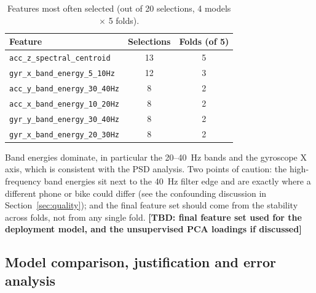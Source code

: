 \documentclass[10pt,a4paper]{article}
\newcommand{\tbd}[1]{\textbf{\textcolor{red!70!black}{[TBD: #1]}}}
\begin{document}
\begin{table}[!htbp]
\centering
\caption{Features most often selected (out of 20 selections, 4 models $\times$ 5 folds).}
\label{tab:feat}
\small
\begin{tabular}{lcc}
\toprule
Feature & Selections & Folds (of 5)\\
\midrule
\texttt{acc\_z\_spectral\_centroid}      & 13 & 5\\
\texttt{gyr\_x\_band\_energy\_5\_10Hz}   & 12 & 3\\
\texttt{acc\_y\_band\_energy\_30\_40Hz}  & 8 & 2\\
\texttt{acc\_x\_band\_energy\_10\_20Hz}  & 8 & 2\\
\texttt{gyr\_y\_band\_energy\_30\_40Hz}  & 8 & 2\\
\texttt{gyr\_x\_band\_energy\_20\_30Hz}  & 8 & 2\\
\bottomrule
\end{tabular}
\end{table}

Band energies dominate, in particular the 20--40~Hz bands and the gyroscope X axis, which is consistent with the PSD analysis. Two points of caution: the high-frequency band energies sit next to the 40~Hz filter edge and are exactly where a different phone or bike could differ (see the confounding discussion in Section~\ref{sec:quality}); and the final feature set should come from the stability across folds, not from any single fold. \tbd{final feature set used for the deployment model, and the unsupervised PCA loadings if discussed}

\subsection{Model comparison, justification and error analysis}
\end{document}
